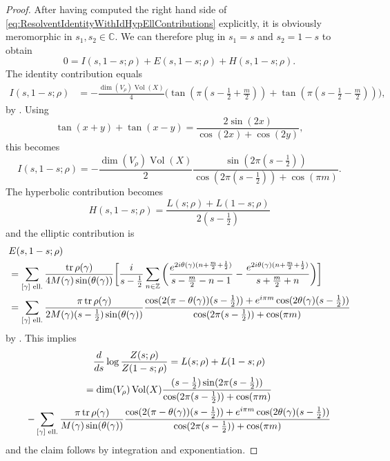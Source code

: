 \documentclass[JEP,XML,SOM,Unicode,NoFloatCountersInSection,published]{cedram}
\theoremstyle{plain}
\theoremstyle{definition}
\theoremstyle{remark}
\newcommand{\Z}{\mathbb{Z}}
\newcommand{\C}{\mathbb{C}}
\DeclareMathOperator{\tr}{tr}
\DeclareMathOperator{\Vol}{Vol}
\numberwithin{equation}{section}
\begin{document}
\begin{proof}
After having computed the right hand side of \cref{eq:ResolventIdentityWithIdHypEllContributions} explicitly, it is obviously meromorphic in $s_1,s_2\in\C$. We can therefore plug in $s_1=s$ and $s_2=1-s$ to obtain
\[
0 = I(s,1-s;\rho)+E(s,1-s;\rho)+H(s,1-s;\rho).
\]
The identity contribution equals
\begin{align*}
I(s,1-s;\rho) &= -\frac{\dim(V_\rho)\Vol(X)}{4}\big(\tan(\pi(s-\tfrac{1}{2}+\tfrac{m}{2}))+\tan(\pi(s-\tfrac{1}{2}-\tfrac{m}{2}))\big),
\end{align*}
by \cite[proof of Th.\,4.2.8]{FS}. Using
\begin{equation*}
\tan(x+y)+\tan(x-y) = \frac{2\sin(2x)}{\cos(2x)+\cos(2y)},\label{eq:TangentIdentity}
\end{equation*}
this becomes
\[
I(s,1-s;\rho) = -\frac{\dim(V_\rho)\Vol(X)}{2}\frac{\sin(2\pi(s-\frac{1}{2}))}{\cos(2\pi(s-\frac{1}{2}))+\cos(\pi m)}.
\]
The hyperbolic contribution becomes
\[
H(s,1-s;\rho) = \frac{L(s;\rho)+L(1-s;\rho)}{2(s-\frac{1}{2})}
\]
and the elliptic contribution is
\begin{align*}
& E(s,1-s;\rho)\\
& =\sum_{[\gamma]\textup{ ell.}} \frac{\tr\rho(\gamma)}{4M(\gamma)\sin(\theta(\gamma))}\bigg[\frac{i}{s-\frac{1}{2}}\sum_{n\in\Z}\bigg(\frac{e^{2i\theta(\gamma)(n+\frac{m}{2}+\frac{1}{2})}}{s-\frac{m}{2}-n-1}-\frac{e^{2i\theta(\gamma)(n+\frac{m}{2}+\frac{1}{2})}}{s+\frac{m}{2}+n}\bigg)\bigg]\\
& =\sum_{[\gamma]\textup{ ell.}} \frac{\pi\tr\rho(\gamma)}{2M(\gamma)(s-\frac{1}{2})\sin(\theta(\gamma))}\frac{\cos(2(\pi-\theta(\gamma))(s-\frac{1}{2}))+e^{i\pi m}\cos(2\theta(\gamma)(s-\frac{1}{2}))}{\cos(2\pi(s-\frac{1}{2}))+\cos(\pi m)}
\end{align*}
by \cite[Eq.\,(**) on p.\,444]{He2}.
This implies
\begin{multline}
\label{eq:logeta}
\frac{d}{ds}\log\frac{Z(s;\rho)}{Z(1-s;\rho)} = L(s;\rho)+L(1-s;\rho)\\
= \dim(V_\rho)\Vol(X)\frac{(s-\frac{1}{2})\sin(2\pi(s-\frac{1}{2}))}{\cos(2\pi(s-\frac{1}{2}))+\cos(\pi m)}\\
- \sum_{[\gamma]\textup{ ell.}}\frac{\pi\tr\rho(\gamma)}{M(\gamma)\sin(\theta(\gamma))}\frac{\cos(2(\pi-\theta(\gamma))(s-\frac{1}{2}))+e^{i\pi m}\cos(2\theta(\gamma)(s-\frac{1}{2}))}{\cos(2\pi(s-\frac{1}{2}))+\cos(\pi m)}
\end{multline}
and the claim follows by integration and exponentiation.
\end{proof}
\end{document}
